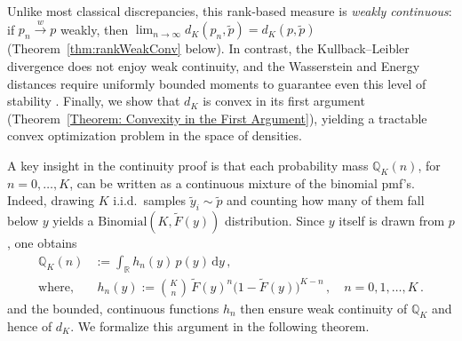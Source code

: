 \documentclass{article}
\begin{document}
Unlike most classical discrepancies, this rank‐based measure is \emph{weakly continuous}: if \(p_n\overset{w}{\longrightarrow} p\) weakly, then \(\lim_{n\to\infty}d_K(p_n,\tilde p)= d_K(p,\tilde p)\) (Theorem~\ref{thm:rankWeakConv} below).  In contrast, the Kullback–Leibler divergence does not enjoy weak continuity, and the Wasserstein and Energy distances require uniformly bounded moments to guarantee even this level of stability \cite[Section 5]{huster2021pareto}.  Finally, we show that \(d_K\) is convex in its first argument (Theorem~\ref{Theorem: Convexity in the First Argument}), yielding a tractable convex optimization problem in the space of densities.

A key insight in the continuity proof is that each probability mass $\mathbb{Q}_{K}(n)$, for $n=0,\ldots, K$, can be written as a continuous mixture of the binomial pmf's. Indeed, drawing \(K\) i.i.d.\ samples \(\tilde y_i\sim\tilde p\) and counting how many of them fall below \(y\) yields a \(\mathrm{Binomial}(K,\tilde F(y))\) distribution.  Since \(y\) itself is drawn from \(p\), one obtains \cite[Appendix 1]{de2024training}
\[
\begin{aligned}
\mathbb{Q}_K(n)&:=\int_{\mathbb{R}}h_{n}(y)\,p(y)\,\mathrm{d}y\,,\\
\text{where, }&\; h_{n}(y):=\binom{K}{n}\,\tilde F(y)^{n}\bigl(1-\tilde F(y)\bigr)^{K-n}\,,\quad n=0,1,\dots,K\,.
\end{aligned}
\]
and the bounded, continuous functions \(h_n\) then ensure weak continuity of \(\mathbb{Q}_K\) and hence of \(d_K\).  We formalize this argument in the following theorem.

\end{document}
